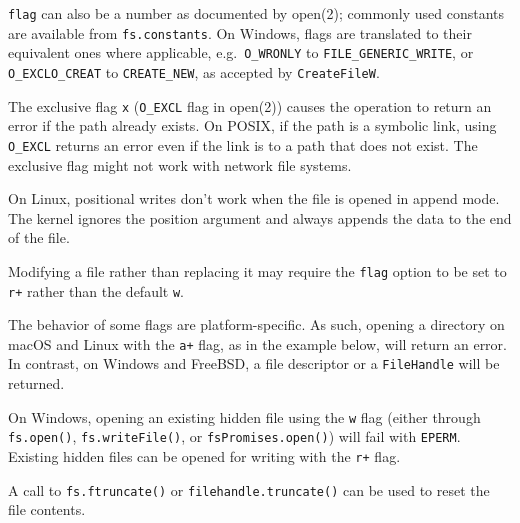 \texttt{flag} can also be a number as documented by open(2); commonly
used constants are available from \texttt{fs.constants}. On Windows,
flags are translated to their equivalent ones where applicable,
e.g.~\texttt{O\_WRONLY} to \texttt{FILE\_GENERIC\_WRITE}, or
\texttt{O\_EXCL\textbar{}O\_CREAT} to \texttt{CREATE\_NEW}, as accepted
by \texttt{CreateFileW}.

The exclusive flag \texttt{\textquotesingle{}x\textquotesingle{}}
(\texttt{O\_EXCL} flag in open(2)) causes the operation to return an
error if the path already exists. On POSIX, if the path is a symbolic
link, using \texttt{O\_EXCL} returns an error even if the link is to a
path that does not exist. The exclusive flag might not work with network
file systems.

On Linux, positional writes don't work when the file is opened in append
mode. The kernel ignores the position argument and always appends the
data to the end of the file.

Modifying a file rather than replacing it may require the \texttt{flag}
option to be set to \texttt{\textquotesingle{}r+\textquotesingle{}}
rather than the default \texttt{\textquotesingle{}w\textquotesingle{}}.

The behavior of some flags are platform-specific. As such, opening a
directory on macOS and Linux with the
\texttt{\textquotesingle{}a+\textquotesingle{}} flag, as in the example
below, will return an error. In contrast, on Windows and FreeBSD, a file
descriptor or a \texttt{FileHandle} will be returned.

\begin{Shaded}
\begin{Highlighting}[]
\NormalTok{(}\OperatorTok{,} \OperatorTok{,}\OperatorTok{,}\KeywordTok{=\textgreater{}}\NormalTok{ \{}
\NormalTok{\})}\OperatorTok{;}

\NormalTok{(}\OperatorTok{,} \OperatorTok{,}\OperatorTok{,}\KeywordTok{=\textgreater{}}\NormalTok{ \{}
\NormalTok{\})}\OperatorTok{;}
\end{Highlighting}
\end{Shaded}

On Windows, opening an existing hidden file using the
\texttt{\textquotesingle{}w\textquotesingle{}} flag (either through
\texttt{fs.open()}, \texttt{fs.writeFile()}, or
\texttt{fsPromises.open()}) will fail with \texttt{EPERM}. Existing
hidden files can be opened for writing with the
\texttt{\textquotesingle{}r+\textquotesingle{}} flag.

A call to \texttt{fs.ftruncate()} or \texttt{filehandle.truncate()} can
be used to reset the file contents.
